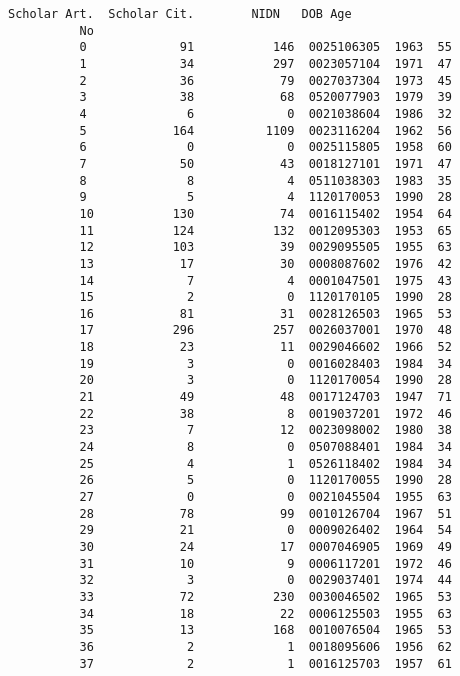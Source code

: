 \documentclass[11pt]{article}
\begin{document}
\begin{Verbatim}[commandchars=\\\{\}]
              Scholar Art.  Scholar Cit.        NIDN   DOB Age  
          No                                                    
          0             91           146  0025106305  1963  55  
          1             34           297  0023057104  1971  47  
          2             36            79  0027037304  1973  45  
          3             38            68  0520077903  1979  39  
          4              6             0  0021038604  1986  32  
          5            164          1109  0023116204  1962  56  
          6              0             0  0025115805  1958  60  
          7             50            43  0018127101  1971  47  
          8              8             4  0511038303  1983  35  
          9              5             4  1120170053  1990  28  
          10           130            74  0016115402  1954  64  
          11           124           132  0012095303  1953  65  
          12           103            39  0029095505  1955  63  
          13            17            30  0008087602  1976  42  
          14             7             4  0001047501  1975  43  
          15             2             0  1120170105  1990  28  
          16            81            31  0028126503  1965  53  
          17           296           257  0026037001  1970  48  
          18            23            11  0029046602  1966  52  
          19             3             0  0016028403  1984  34  
          20             3             0  1120170054  1990  28  
          21            49            48  0017124703  1947  71  
          22            38             8  0019037201  1972  46  
          23             7            12  0023098002  1980  38  
          24             8             0  0507088401  1984  34  
          25             4             1  0526118402  1984  34  
          26             5             0  1120170055  1990  28  
          27             0             0  0021045504  1955  63  
          28            78            99  0010126704  1967  51  
          29            21             0  0009026402  1964  54  
          30            24            17  0007046905  1969  49  
          31            10             9  0006117201  1972  46  
          32             3             0  0029037401  1974  44  
          33            72           230  0030046502  1965  53  
          34            18            22  0006125503  1955  63  
          35            13           168  0010076504  1965  53  
          36             2             1  0018095606  1956  62  
          37             2             1  0016125703  1957  61  

\end{Verbatim}
\end{document}
